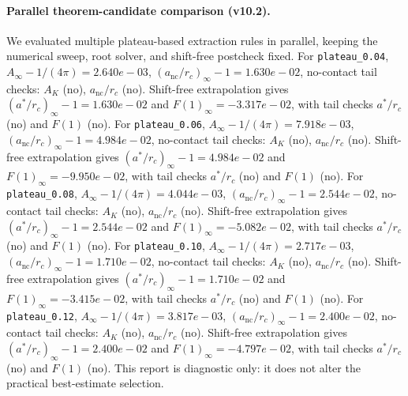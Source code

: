 \paragraph{Parallel theorem-candidate comparison (v10.2).}
We evaluated multiple plateau-based extraction rules in parallel, keeping the numerical sweep, root solver, and shift-free postcheck fixed. For \texttt{plateau_0.04}, $A_\infty-1/(4\pi)=2.640e-03$, $(a_{\mathrm{nc}}/r_c)_\infty-1=1.630e-02$, no-contact tail checks: $A_K$ (no), $a_{\mathrm{nc}}/r_c$ (no). Shift-free extrapolation gives $(a^*/r_c)_\infty-1=1.630e-02$ and $F(1)_\infty=-3.317e-02$, with tail checks $a^*/r_c$ (no) and $F(1)$ (no). For \texttt{plateau_0.06}, $A_\infty-1/(4\pi)=7.918e-03$, $(a_{\mathrm{nc}}/r_c)_\infty-1=4.984e-02$, no-contact tail checks: $A_K$ (no), $a_{\mathrm{nc}}/r_c$ (no). Shift-free extrapolation gives $(a^*/r_c)_\infty-1=4.984e-02$ and $F(1)_\infty=-9.950e-02$, with tail checks $a^*/r_c$ (no) and $F(1)$ (no). For \texttt{plateau_0.08}, $A_\infty-1/(4\pi)=4.044e-03$, $(a_{\mathrm{nc}}/r_c)_\infty-1=2.544e-02$, no-contact tail checks: $A_K$ (no), $a_{\mathrm{nc}}/r_c$ (no). Shift-free extrapolation gives $(a^*/r_c)_\infty-1=2.544e-02$ and $F(1)_\infty=-5.082e-02$, with tail checks $a^*/r_c$ (no) and $F(1)$ (no). For \texttt{plateau_0.10}, $A_\infty-1/(4\pi)=2.717e-03$, $(a_{\mathrm{nc}}/r_c)_\infty-1=1.710e-02$, no-contact tail checks: $A_K$ (no), $a_{\mathrm{nc}}/r_c$ (no). Shift-free extrapolation gives $(a^*/r_c)_\infty-1=1.710e-02$ and $F(1)_\infty=-3.415e-02$, with tail checks $a^*/r_c$ (no) and $F(1)$ (no). For \texttt{plateau_0.12}, $A_\infty-1/(4\pi)=3.817e-03$, $(a_{\mathrm{nc}}/r_c)_\infty-1=2.400e-02$, no-contact tail checks: $A_K$ (no), $a_{\mathrm{nc}}/r_c$ (no). Shift-free extrapolation gives $(a^*/r_c)_\infty-1=2.400e-02$ and $F(1)_\infty=-4.797e-02$, with tail checks $a^*/r_c$ (no) and $F(1)$ (no). This report is diagnostic only: it does not alter the practical best-estimate selection.
